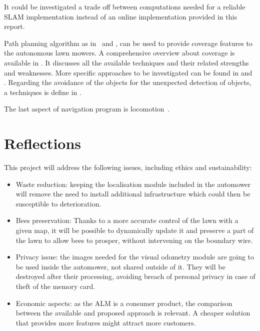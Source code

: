 It could be investigated a trade off between computations needed for a reliable SLAM implementation instead of an online implementation provided in this report.




Path planning algorithm as in~\cite{coveragePathplanning} and \cite{machines6040046}, can be used to provide coverage features to the autonomous lawn mowers.
A comprehensive overview about coverage is available in \cite{galceran_survey_2013}. It discusses all the available techniques and their related strengths and weaknesses.
More specific approaches to be investigated can be found in \cite{hameed_coverage_2017} and \cite{cabreira_grid-based_2019}.
Regarding the avoidance of the objects for the unexpected detection of objects, a techniques is define in \cite{daltorio_obstacle-edging_2010}.

The last aspect of navigation program is locomotion~\cite{autonomous-yasuda}.




\section{Reflections}
\label{sec:reflections}

\noindent This project will address the following issues, including ethics and sustainability:
\begin{itemize}
    \item Waste reduction: keeping the localisation module included in the automower will remove the need to install additional infrastructure which could then be susceptible to deterioration.
    \item Bees preservation: Thanks to a more accurate control of the lawn with a given map, it will be possible to dynamically update it and preserve a part of the lawn to allow bees to prosper, without intervening on the boundary wire.
    \item Privacy issue: the images needed for the visual odometry module are going to be used inside the automower, not shared outside of it. They will be destroyed after their processing, avoiding breach of personal privacy in case of theft of the memory card.
    \item Economic aspects: as the \gls{ALM} is a consumer product, the comparison between the available and proposed approach is relevant. A cheaper solution that provides more features might attract more customers.
\end{itemize}

